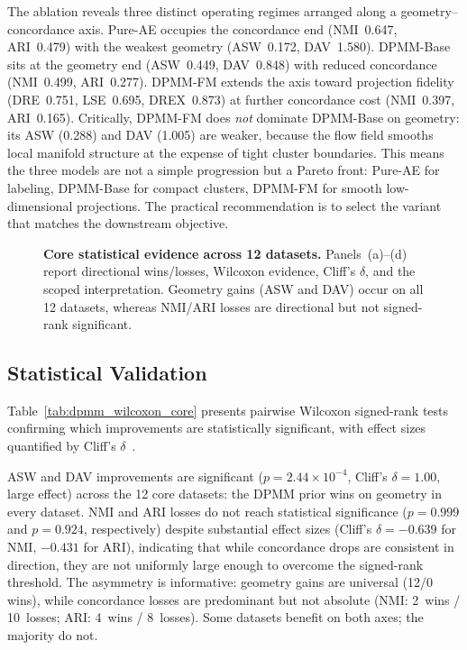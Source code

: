 \documentclass[biology,article,submit,pdftex,moreauthors]{Definitions/mdpi}
\begin{document}
The ablation reveals three distinct operating regimes arranged along a geometry--concordance axis. Pure-AE occupies the concordance end (NMI~0.647, ARI~0.479) with the weakest geometry (ASW~0.172, DAV~1.580). DPMM-Base sits at the geometry end (ASW~0.449, DAV~0.848) with reduced concordance (NMI~0.499, ARI~0.277). DPMM-FM extends the axis toward projection fidelity (DRE~0.751, LSE~0.695, DREX~0.873) at further concordance cost (NMI~0.397, ARI~0.165). Critically, DPMM-FM does \emph{not} dominate DPMM-Base on geometry: its ASW (0.288) and DAV (1.005) are weaker, because the flow field smooths local manifold structure at the expense of tight cluster boundaries. This means the three models are not a simple progression but a Pareto front: Pure-AE for labeling, DPMM-Base for compact clusters, DPMM-FM for smooth low-dimensional projections. The practical recommendation is to select the variant that matches the downstream objective.

\begin{figure}[H]
\centering

\caption{\textbf{Core statistical evidence across 12 datasets.} Panels~(a)--(d) report directional wins/losses, Wilcoxon evidence, Cliff's $\delta$, and the scoped interpretation. Geometry gains (ASW and DAV) occur on all 12 datasets, whereas NMI/ARI losses are directional but not signed-rank significant.}
\label{fig:statistics}
\end{figure}

\subsection{Statistical Validation}
Table~\ref{tab:dpmm_wilcoxon_core} presents pairwise Wilcoxon signed-rank tests~\cite{wilcoxon1945individual} confirming which improvements are statistically significant, with effect sizes quantified by Cliff's $\delta$~\cite{cliff1993dominance}.



ASW and DAV improvements are significant ($p = 2.44\times10^{-4}$, Cliff's $\delta = 1.00$, large effect) across the 12 core datasets: the DPMM prior wins on geometry in every dataset. NMI and ARI losses do not reach statistical significance ($p = 0.999$ and $p = 0.924$, respectively) despite substantial effect sizes (Cliff's $\delta = -0.639$ for NMI, $-0.431$ for ARI), indicating that while concordance drops are consistent in direction, they are not uniformly large enough to overcome the signed-rank threshold. The asymmetry is informative: geometry gains are universal (12/0 wins), while concordance losses are predominant but not absolute (NMI: 2~wins / 10~losses; ARI: 4~wins / 8~losses). Some datasets benefit on both axes; the majority do not.
\end{document}
